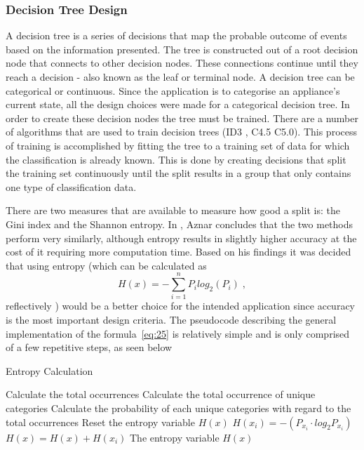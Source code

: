 \subsubsection{Decision Tree Design}
\label{sec:DT}
A decision tree is a series of decisions that map the probable outcome of events based on the information presented. The tree is constructed out of a root decision node that connects to other decision nodes. These connections continue until they reach a decision - also known as the leaf or terminal node. A decision tree can be categorical or continuous. Since the application is to categorise an appliance's current state, all the design choices were made for a categorical decision tree. In order to create these decision nodes the tree must be trained. There are a number of algorithms that are used to train decision trees (ID3 , C4.5 C5.0). 
This process of training is accomplished by fitting the tree to a training set of data for which the classification is already known. This is done by creating decisions that split the training set continuously until the split results in a group that only contains one type of classification data.   
\par
There are two measures that are available to measure how good a split is: the Gini index and the Shannon entropy. In \cite{aznar_2020}, Aznar concludes that the two methods perform very similarly, although entropy results in slightly higher accuracy at the cost of it requiring more computation time. Based on his findings it was decided that using entropy (which can be calculated as 
\begin{equation}
    H(x) = -\sum_{i=1}^{n} P_{i} log_{2} (P_{i})\;,
    \label{eq:25}
\end{equation}
reflectively \cite{lathi_ding_2009})  would be a better choice for the intended application since accuracy is the most important design criteria. The pseudocode describing the general implementation of the formula~\ref{eq:25} is relatively simple and is only comprised of a few repetitive steps, as seen below 
\begin{algorithm}[H]
\caption{Entropy Calculation}
\begin{algorithmic}
\State  Calculate the total occurrences
\State  Calculate the total occurrence of unique categories
\State  Calculate the probability of each unique categories with regard to the total
occurrences
\State Reset the entropy variable $H(x)$
\State $H(x_{i}) = -(P_{x_{i}} \cdot log_{2} P_{x_{i}})$
\State $H(x) = H(x) + H(x_{i})$
\EndFor
\State \Return The entropy variable $H(x)$
\end{algorithmic}
\end{algorithm}


